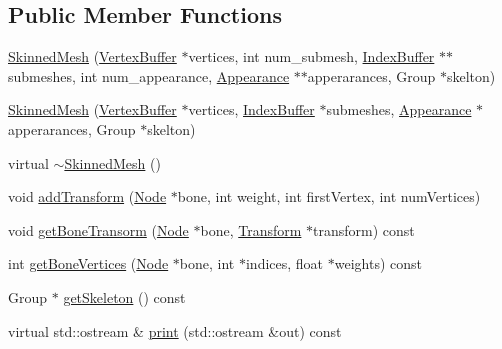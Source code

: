 \subsection*{Public Member Functions}
\begin{CompactItemize}
\item 
\hyperlink{classm3g_1_1SkinnedMesh_9ee04e655db4e2a95a0ab55d8ebb45c8}{SkinnedMesh} (\hyperlink{classm3g_1_1VertexBuffer}{VertexBuffer} $\ast$vertices, int num\_\-submesh, \hyperlink{classm3g_1_1IndexBuffer}{IndexBuffer} $\ast$$\ast$submeshes, int num\_\-appearance, \hyperlink{classm3g_1_1Appearance}{Appearance} $\ast$$\ast$apperarances, Group $\ast$skelton)
\item 
\hyperlink{classm3g_1_1SkinnedMesh_145692b6dfd3581aae05ef8f5db20a99}{SkinnedMesh} (\hyperlink{classm3g_1_1VertexBuffer}{VertexBuffer} $\ast$vertices, \hyperlink{classm3g_1_1IndexBuffer}{IndexBuffer} $\ast$submeshes, \hyperlink{classm3g_1_1Appearance}{Appearance} $\ast$apperarances, Group $\ast$skelton)
\item 
virtual \hyperlink{classm3g_1_1SkinnedMesh_c73da5b5c5f8f14fc241328b4b78928c}{$\sim$SkinnedMesh} ()
\item 
void \hyperlink{classm3g_1_1SkinnedMesh_4b6fd5f52884251fdda11ad4a40d41d4}{addTransform} (\hyperlink{classm3g_1_1Node}{Node} $\ast$bone, int weight, int firstVertex, int numVertices)
\item 
void \hyperlink{classm3g_1_1SkinnedMesh_b0023a2cdce8d562a4988024e8644a13}{getBoneTransorm} (\hyperlink{classm3g_1_1Node}{Node} $\ast$bone, \hyperlink{classm3g_1_1Transform}{Transform} $\ast$transform) const 
\item 
int \hyperlink{classm3g_1_1SkinnedMesh_e14038d004d58e797f10fbfa6a9a18d9}{getBoneVertices} (\hyperlink{classm3g_1_1Node}{Node} $\ast$bone, int $\ast$indices, float $\ast$weights) const 
\item 
Group $\ast$ \hyperlink{classm3g_1_1SkinnedMesh_ce7d69c2b600f6f01a46214db28e6f92}{getSkeleton} () const 
\item 
virtual std::ostream \& \hyperlink{classm3g_1_1SkinnedMesh_6fea17fa1532df3794f8cb39cb4f911f}{print} (std::ostream \&out) const 
\end{CompactItemize}
